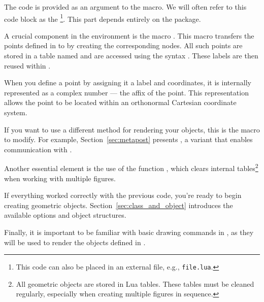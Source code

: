 The  code is provided as an argument to the  macro. We will often refer to this code block as the \footnote{This code can also be placed in an external file, e.g., \texttt{file.lua}.}. This part depends entirely on the  package.

A crucial component in the  environment is the macro . This macro transfers the points defined in  to \tkzNamePack{\TIKZ} by creating the corresponding nodes. All such points are stored in a table named  and are accessed using the syntax . These labels are then reused within .

When you define a point by assigning it a label and coordinates, it is internally represented as a complex number — the affix of the point. This representation allows the point to be located within an orthonormal Cartesian coordinate system.

If you want to use a different method for rendering your objects, this is the macro to modify. For example, Section~\ref{sec:metapost} presents , a variant that enables communication with .

Another essential element is the use of the function , which clears internal tables\footnote{All geometric objects are stored in Lua tables. These tables must be cleaned regularly, especially when creating multiple figures in sequence.} when working with multiple figures.

If everything worked correctly with the previous code, you're ready to begin creating geometric objects. Section~\ref{sec:class_and_object} introduces the available options and object structures.

Finally, it is important to be familiar with basic drawing commands in , as they will be used to render the objects defined in .
\endinput